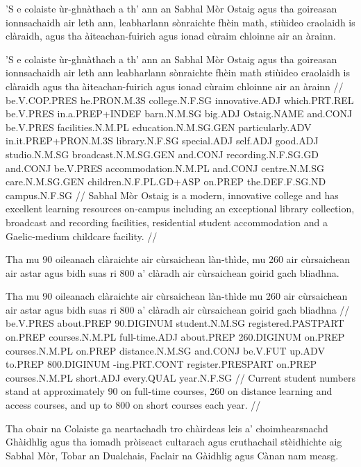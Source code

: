 \documentclass[a4paper,10pt]{article}
\begin{document}
\ex
\begingl
\glpre 'S e colaiste ùr-ghnàthach a th' ann an Sabhal Mòr Ostaig agus tha goireasan ionnsachaidh air leth ann, leabharlann sònraichte fhèin math, stiùideo craolaidh is clàraidh, agus tha àiteachan-fuirich agus ionad cùraim chloinne air an àrainn. 

\vspace{4mm}
\gla 'S e colaiste ùr-ghnàthach a th' {ann an} Sabhal Mòr Ostaig agus tha goireasan ionnsachaidh {air leth} ann leabharlann sònraichte fhèin math stiùideo craolaidh is clàraidh agus tha àiteachan-fuirich agus ionad cùraim chloinne air an àrainn  //
\glb be.V.COP.PRES he.PRON.M.3S college.N.F.SG innovative.ADJ which.PRT.REL be.V.PRES in.a.PREP+INDEF barn.N.M.SG big.ADJ Ostaig.NAME and.CONJ be.V.PRES facilities.N.M.PL education.N.M.SG.GEN particularly.ADV in.it.PREP+PRON.M.3S library.N.F.SG special.ADJ self.ADJ good.ADJ studio.N.M.SG broadcast.N.M.SG.GEN and.CONJ recording.N.F.SG.GD and.CONJ be.V.PRES accommodation.N.M.PL and.CONJ centre.N.M.SG care.N.M.SG.GEN children.N.F.PL.GD+ASP on.PREP the.DEF.F.SG.ND campus.N.F.SG  //
\glft Sabhal Mòr Ostaig is a modern, innovative college and has excellent learning resources on-campus including an exceptional library collection, broadcast and recording facilities, residential student accommodation and a Gaelic-medium childcare facility. //
\endgl
\xe

\ex
\begingl
\glpre Tha mu 90 oileanach clàraichte air cùrsaichean làn-thìde, mu 260 air cùrsaichean air astar agus bidh suas ri 800 a' clàradh air cùrsaichean goirid gach bliadhna. 

\vspace{4mm}
\gla Tha mu 90 oileanach clàraichte air cùrsaichean làn-thìde mu 260 air cùrsaichean air astar agus bidh suas ri 800 a' clàradh air cùrsaichean goirid gach bliadhna  //
\glb be.V.PRES about.PREP 90.DIGINUM student.N.M.SG registered.PASTPART on.PREP courses.N.M.PL full-time.ADJ about.PREP 260.DIGINUM on.PREP courses.N.M.PL on.PREP distance.N.M.SG and.CONJ be.V.FUT up.ADV to.PREP 800.DIGINUM -ing.PRT.CONT register.PRESPART on.PREP courses.N.M.PL short.ADJ every.QUAL year.N.F.SG  //
\glft Current student numbers stand at approximately 90 on full-time courses, 260 on distance learning and access courses, and up to 800 on short courses each year. //
\endgl
\xe

\ex
\begingl
\glpre Tha obair na Colaiste ga neartachadh tro chàirdeas leis a' choimhearsnachd Ghàidhlig agus tha iomadh pròiseact cultarach agus cruthachail stèidhichte aig Sabhal Mòr, Tobar an Dualchais, Faclair na Gàidhlig agus Cànan nam measg. 
\end{document}
